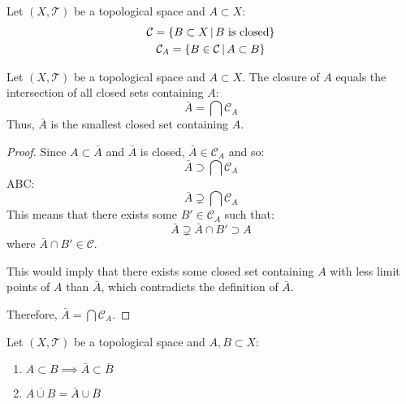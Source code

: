 \documentclass[letterpaper,12pt,fleqn]{article}
\newcommand{\T}{\mathscr{T}}
\renewcommand{\C}{\mathcal{C}}
\begin{document}
\begin{notation}
  Let \((X,\T)\) be a topological space and \(A\subset X\):
  \begin{gather*}
    \C=\setb{B\subset X}{B\ \text{is closed}} \\
    \C_A=\setb{B\in\C}{A\subset B}
  \end{gather*}
\end{notation}

\begin{theorem}[2.20]
  Let \((X,\T)\) be a topological space and \(A\subset X\).  The closure of \(A\) equals the intersection of all
  closed sets containing \(A\):
  \[\bar{A}=\bigcap\C_A\]
  Thus, \(\bar{A}\) is the smallest closed set containing \(A\).
\end{theorem}

\begin{proof}
  Since \(A\subset\bar{A}\) and \(\bar{A}\) is closed, \(\bar{A}\in\C_A\) and so:
  \[\bar{A}\supset\bigcap\C_A\]
  ABC:
  \[\bar{A}\supsetneq\bigcap\C_A\]
  This means that there exists some \(B'\in\C_A\) such that:
  \[\bar{A}\supsetneq\bar{A}\cap B'\supset A\]
  where \(\bar{A}\cap B'\in\C\).

  This would imply that there exists some closed set containing \(A\) with less limit points of \(A\) than
  \(\bar{A}\), which contradicts the definition of \(\bar{A}\).

  Therefore, \(\displaystyle\bar{A}=\bigcap\C_A\).
\end{proof}

\begin{theorem}[2.22]
  Let \((X,\T)\) be a topological space and \(A,B\subset X\):
  \begin{enumerate}
  \item \(A\subset B\implies \bar{A}\subset\bar{B}\)
  \item \(\overline{A\cup B}=\bar{A}\cup\bar{B}\)
  \end{enumerate}
\end{theorem}
\end{document}
